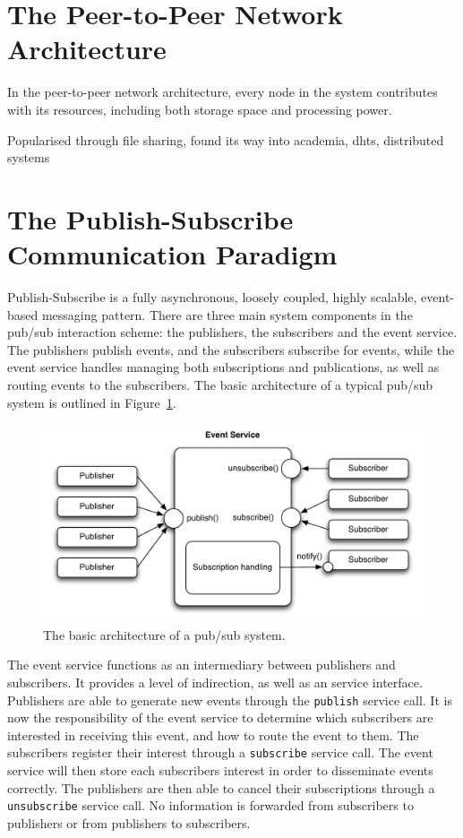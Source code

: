 \section{The Peer-to-Peer Network Architecture}
In the peer-to-peer network architecture, every node in the system
contributes with its resources, including both storage space and
processing power.

Popularised through file sharing, found its way into academia, dhts,
distributed systems

\section{The Publish-Subscribe Communication Paradigm}

Publish-Subscribe is a fully asynchronous, loosely coupled,
highly scalable, event-based messaging pattern. There are three main
system components in the pub/sub interaction scheme: the publishers, the
subscribers and the event service. The publishers publish events, and
the subscribers subscribe for events, while the event service handles
managing both subscriptions and publications, as well as routing events
to the subscribers. The basic architecture of a typical pub/sub system
is outlined in Figure~\ref{fig:pubsubarch}.

\begin{figure}
\centering
\includegraphics[width=\textwidth]{figures/pubsubarch}
\caption{The basic architecture of a pub/sub system.}
\label{fig:pubsubarch}
\end{figure}

The event service functions as an intermediary between publishers and
subscribers. It provides a level of indirection, as well as an service
interface. Publishers are able to generate new events through the
\texttt{publish} service call. It is now the responsibility of the event
service to determine which subscribers are interested in receiving this
event, and how to route the event to them. The subscribers register
their interest through a \texttt{subscribe} service call. The event
service will then store each subscribers interest in order to
disseminate events correctly. The publishers are then able to cancel
their subscriptions through a \texttt{unsubscribe} service call. No
information is forwarded from subscribers to publishers or from
publishers to subscribers.

